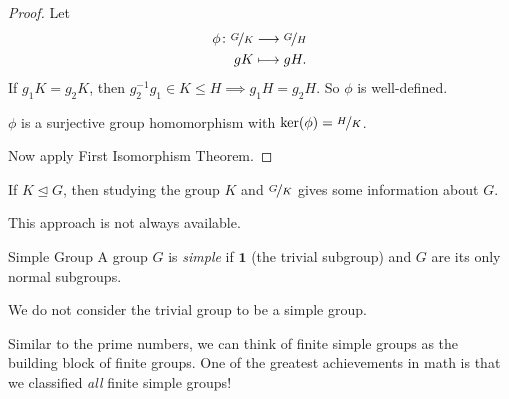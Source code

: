 \begin{proof}
    Let
    \begin{equation*}
    \begin{aligned}
      \phi\colon \nicefrac{G}{K} & \longrightarrow \nicefrac{G}{H}      \\
      gK          & \longmapsto gH.
    \end{aligned}
    \end{equation*}
    If \(g_1 K = g_2 K\), then \(g_2^{-1} g_1 \in K \leq  H\implies g_{1} H = g_2 H\). So \(\phi\) is well-defined.

    \(\phi\) is a surjective group homomorphism with \(\ker(\phi) = \nicefrac{H}{K}\).

    Now apply First Isomorphism Theorem.
\end{proof}

If \(K \trianglelefteq G\), then studying the group \(K\) and \(\nicefrac{G}{K}\) gives some information about \(G\).

This approach is not always available.
\begin{definition}{Simple Group}{}
    A group \(G\) is \textit{simple} if \(\textbf{1} \) (the trivial subgroup) and \(G\) are its only normal subgroups.
\end{definition}
\begin{notation}
    We do not consider the trivial group to be a simple group.
\end{notation}
Similar to the prime numbers, we can think of finite simple groups as the building block of finite groups. One of the greatest achievements in math is that we classified \textit{all} finite simple groups!

